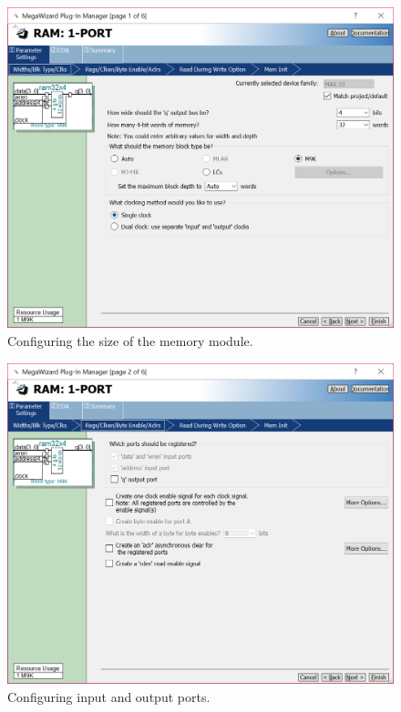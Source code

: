 \documentclass[epsfig,10pt,fullpage]{article}
\begin{document}
\begin{enumerate}
\begin{figure}[H]
	\begin{center}
		\includegraphics[scale=0.40]{figures/figure2.png}
	\end{center}
	\caption{Configuring the size of the memory module.}
	\label{fig:fig2}
\end{figure}

\begin{figure}[H]
	\begin{center}
		\includegraphics[scale=0.50]{figures/figure3.png}
	\end{center}
	\caption{Configuring input and output ports.}
	\label{fig:fig3}
\end{figure}


\end{enumerate}
\end{document}
